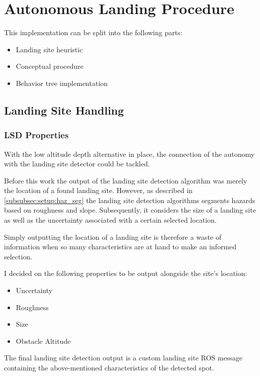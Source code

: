 \chapter{Autonomous Landing Procedure}\label{chapter:autonomous_landing_procedure}

This implementation can be split into the following parts:
\begin{itemize}
    \item Landing site heuristic

    \item Conceptual procedure
    
    \item Behavior tree implementation
\end{itemize}



\section{Landing Site Handling}\label{subsubsec:LandingSiteHeuristic}

\subsection{LSD Properties}\label{sec:LSproperties}

With the low altitude depth alternative in place, the connection of the autonomy with the landing site detector could be tackled. 

Before this work the output of the landing site detection algorithm was merely the location of a found landing site. However, as described in \cref{subsubsec:setup:haz_seg} the landing site detection algorithms segments hazards based on roughness and slope. Subsequently, it considers the size of a landing site as well as the uncertainty associated with a certain selected location. 

Simply outputting the location of a landing site is therefore a waste of information when so many characteristics are at hand to make an informed selection. 

I decided on the following properties to be output alongside the site's location:

\begin{itemize}
    \item Uncertainty
    \item Roughness
    \item Size
    \item Obstacle Altitude
\end{itemize}
The final landing site detection output is a custom landing site ROS message containing the above-mentioned characteristics of the detected spot.

